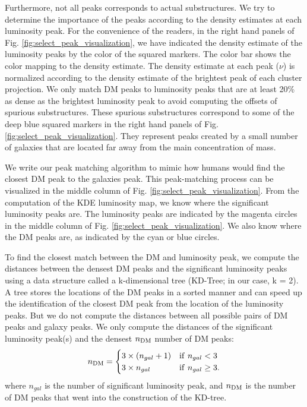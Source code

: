 Furthermore, not all peaks corresponds to actual substructures.
We try to determine the importance of the peaks according to the density 
estimates at each luminosity peak. For the convenience of the readers, 
in the right hand panels of Fig. \ref{fig:select_peak_visualization},
we have indicated the density estimate of the luminosity peaks 
by the color of the squared markers. 
The color bar shows the color mapping to the density estimate.
The density estimate at each peak ($\nu$) is normalized according to the density
estimate of the brightest peak of each cluster projection. 
We only match DM peaks to luminosity 
peaks that are at least 20\% as dense as the brightest luminosity peak to avoid 
computing the offsets of spurious substructures.
These spurious substructures correspond to some of 
the deep blue squared markers in the right hand panels of Fig.
\ref{fig:select_peak_visualization}.
They represent peaks created by a small number of galaxies that
are located far away from the main concentration of mass.

We write our peak matching algorithm to mimic how humans would
find the closest DM peak to the galaxies peak. 
This peak-matching process can be visualized in the middle column of 
Fig. \ref{fig:select_peak_visualization}.
From the computation of the KDE luminosity map,
we know where the significant luminosity peaks are. 
The luminosity peaks are indicated by the magenta circles in the middle column
of Fig. \ref{fig:select_peak_visualization}.
We also know where the DM peaks are, as indicated by the cyan or blue circles.

To find the closest match between the DM and luminosity peak, 
we compute the distances between the densest DM peaks
and the significant luminosity peaks using a data structure called 
a k-dimensional tree (KD-Tree; in
our case, k = 2). A tree stores the locations of the DM peaks in a sorted
manner and can speed up the identification of the closest DM peak from the
location of the luminosity peaks.
But we do not compute the distances
between all possible pairs of DM peaks and galaxy peaks.  
We only compute the distances of the significant luminosity peak(s) and 
the densest $n_{\rm DM}$ number of DM peaks:
\begin{equation}
	n_{\rm DM} = \begin{cases}		
		3 \times (n_{gal} + 1) & {\rm if~} n_{gal} < 3 \\
	3 \times n_{gal}  & {\rm if~} n_{gal} \geq 3.
	\end{cases}
	\label{eq:peak_threshold}
\end{equation}
where $n_{gal}$ is the number of significant luminosity peak, and $n_{\rm DM}$
is the number of DM peaks that went into the construction of the KD-tree.

